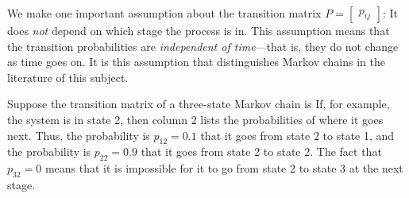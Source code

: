 \documentclass{ximera}
\begin{document}
We make one important assumption about the transition matrix $P = \begin{bmatrix}
p_{ij}
\end{bmatrix}$: It does \textit{not} depend on which stage the process is in. This assumption means that the transition probabilities are \textit{independent of time}---that is, they do not change as time goes on. It is this assumption that distinguishes Markov chains in the literature of this subject.

\begin{example}\label{007243}
Suppose the transition matrix of a three-state Markov chain is
If, for example, the system is in state 2, then column 2 lists the probabilities of where it goes next. Thus, the probability is $p_{12} = 0.1$ that it goes from state 2 to state 1, and the probability is $p_{22} = 0.9$ that it goes from state 2 to state 2. The fact that $p_{32} = 0$ means that it is impossible for it to go from state 2 to state 3 at the next stage.
\end{example}
\end{document}
